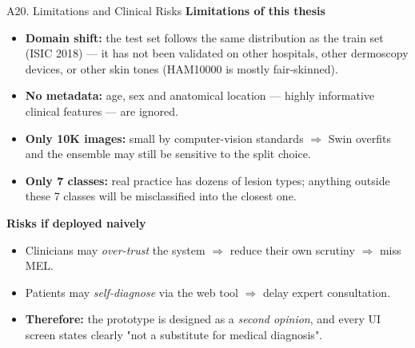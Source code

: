 \documentclass[10pt, aspectratio=169]{beamer}
\begin{document}
\begin{frame}{A20. Limitations and Clinical Risks}
    \footnotesize
    \textbf{Limitations of this thesis}
    \begin{itemize}
        \item \textbf{Domain shift:} the test set follows the same distribution as the train set (ISIC 2018) --- it has not been validated on other hospitals, other dermoscopy devices, or other skin tones (HAM10000 is mostly fair-skinned).
        \item \textbf{No metadata:} age, sex and anatomical location --- highly informative clinical features --- are ignored.
        \item \textbf{Only 10K images:} small by computer-vision standards $\Rightarrow$ Swin overfits and the ensemble may still be sensitive to the split choice.
        \item \textbf{Only 7 classes:} real practice has dozens of lesion types; anything outside these 7 classes will be misclassified into the closest one.
    \end{itemize}

    \vspace{0.2cm}
    \textbf{Risks if deployed naively}
    \begin{itemize}
        \item Clinicians may \textit{over-trust} the system $\Rightarrow$ reduce their own scrutiny $\Rightarrow$ miss MEL.
        \item Patients may \textit{self-diagnose} via the web tool $\Rightarrow$ delay expert consultation.
        \item \textbf{Therefore:} the prototype is designed as a \textit{second opinion}, and every UI screen states clearly "not a substitute for medical diagnosis".
    \end{itemize}
\end{frame}
\end{document}
